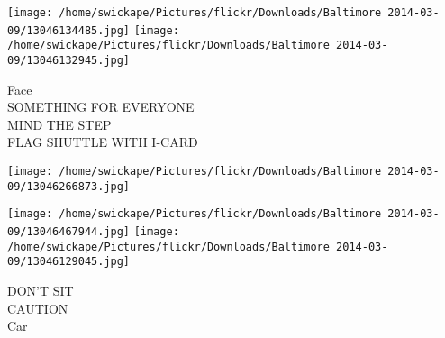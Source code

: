 \documentclass[10pt,letterpaper]{article}
\begin{document}
\texttt{[image: /home/swickape/Pictures/flickr/Downloads/Baltimore 2014-03-09/13046134485.jpg]}
\texttt{[image: /home/swickape/Pictures/flickr/Downloads/Baltimore 2014-03-09/13046132945.jpg]}

Face\\
SOMETHING FOR EVERYONE\\
MIND THE STEP\\
FLAG SHUTTLE WITH I{-}CARD
\pagebreak

\texttt{[image: /home/swickape/Pictures/flickr/Downloads/Baltimore 2014-03-09/13046266873.jpg]}

\vspace{0.25in}
\texttt{[image: /home/swickape/Pictures/flickr/Downloads/Baltimore 2014-03-09/13046467944.jpg]}
\texttt{[image: /home/swickape/Pictures/flickr/Downloads/Baltimore 2014-03-09/13046129045.jpg]}

DON'T SIT\\
CAUTION\\
Car
\pagebreak
\end{document}

